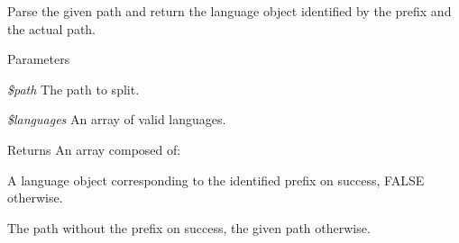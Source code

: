 Parse the given path and return the language object identified by the prefix and the actual path.


\begin{DoxyParams}{Parameters}
\item[{\em \$path}]The path to split. \item[{\em \$languages}]An array of valid languages.\end{DoxyParams}
\begin{DoxyReturn}{Returns}
An array composed of:
\begin{DoxyItemize}
\item A language object corresponding to the identified prefix on success, FALSE otherwise.
\item The path without the prefix on success, the given path otherwise. 
\end{DoxyItemize}
\end{DoxyReturn}
